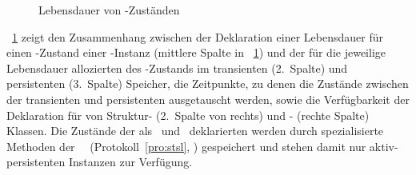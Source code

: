 %
\begin{figure}[htbp]%
\ifbuch%
\centerline{}%
\else%
\centerline{}%
\fi%
\caption{Lebensdauer von \protect\Slt\/-Zust\"{a}nden}%
\label{fig:extent}%
\end{figure}%
%
\par{}\figurename~\ref{fig:extent} zeigt den Zusammenhang zwischen der
Deklaration einer Lebensdauer f\"{u}r einen \Slt\/-Zustand einer
\clos-Instanz (mittlere Spalte in \figurename~\ref{fig:extent}) und der
f\"{u}r die jeweilige Lebensdauer allozierten \representation{} des
\Slt\/-Zustands im transienten (2.~Spalte) und persistenten
(3.~Spalte) Speicher, die Zeitpunkte, zu denen die Zust\"{a}nde zwischen
der transienten und persistenten \representation{} ausgetauscht werden,
sowie die Verf\"{u}gbarkeit der Deklaration f\"{u}r \Slt[s]\/ von Struktur-
(2.~Spalte von rechts) und \clos- (rechte Spalte) Klassen.  Die
Zust\"{a}nde der als \ und
\ deklarierten \Slt[s]\/ werden durch spezialisierte
Methoden der \gfn[n]\ \ (Protokoll~\ref{pro:stsl},
\citepage{\pageref{pro:stsl}}) gespeichert und stehen damit nur
aktiv-persistenten Instanzen zur Verf\"{u}gung.
%
%
